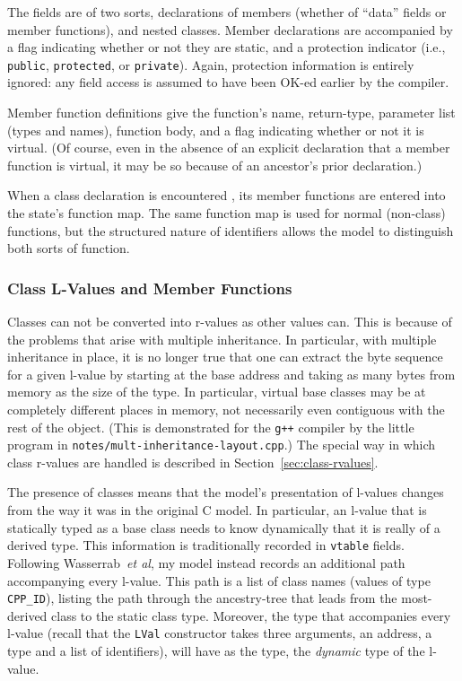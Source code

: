\documentclass[11pt]{article}
\begin{document}
The fields are of two sorts, declarations of members (whether of
``data'' fields or member functions), and nested classes.  Member
declarations are accompanied by a flag indicating whether or not they
are static, and a protection indicator (i.e., \texttt{public},
\texttt{protected}, or \texttt{private}).  Again, protection
information is entirely ignored: any field access is assumed to have
been OK-ed earlier by the compiler.

Member function definitions give the function's name, return-type,
parameter list (types and names), function body, and a flag indicating
whether or not it is virtual.  (Of course, even in the absence of an
explicit declaration that a member function is virtual, it may be so
because of an ancestor's prior declaration.)

When a class declaration is encountered , its member functions are
entered into the state's function map.  The same function map is used
for normal (non-class) functions, but the structured nature of \cpp{}
identifiers allows the model to distinguish both sorts of function.

\subsubsection{Class L-Values and Member Functions}
\label{sec:class-values}
Classes can not be converted into r-values as other values can.  This
is because of the problems that arise with multiple inheritance.  In
particular, with multiple inheritance in place, it is no longer true
that one can extract the byte sequence for a given l-value by starting
at the base address and taking as many bytes from memory as the size
of the type.  In particular, virtual base classes may be at completely
different places in memory, not necessarily even contiguous with the
rest of the object.  (This is demonstrated for the \texttt{g++}
compiler by the little program in
\texttt{notes/mult-inheritance-layout.cpp}.)  The special way in which class r-values are handled is described in Section~\ref{sec:class-rvalues}.

%
The presence of classes means that the model's presentation of
l-values changes from the way it was in the original C model.  In
particular, an l-value that is statically typed as a base class needs
to know dynamically that it is really of a derived type.  This
information is traditionally recorded in \texttt{vtable} fields.
Following Wasserrab~\emph{et al}, my model instead records an
additional path accompanying every l-value.  This path is a list of
class names (values of type \texttt{CPP_ID}), listing the path through the
ancestry-tree that leads from the most-derived class to the static
class type.  Moreover, the type that accompanies every l-value (recall
that the \texttt{LVal} constructor takes three arguments, an address,
a type and a list of identifiers), will have as the type, the
\emph{dynamic} type of the l-value.
\end{document}
